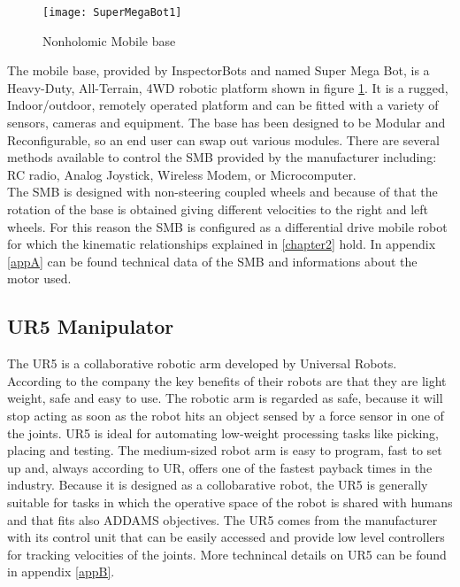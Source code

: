 \begin{figure}[h]
	\begin{center} 
		\texttt{[image: SuperMegaBot1]}
		\centering
		\caption{Nonholomic Mobile base}
		\label{fig:SuperMegaBot1}
	\end{center}
\end{figure}
The mobile base, provided by InspectorBots and named Super Mega Bot, is a Heavy-Duty, All-Terrain, 4WD robotic platform shown in figure \ref{fig:SuperMegaBot1}. It is a rugged, Indoor/outdoor, remotely operated platform and can be fitted with a variety of sensors, cameras and equipment. The base has been designed to be Modular and Reconfigurable, so an end user can swap out various modules. There are several methods available to control the SMB provided by the manufacturer including: RC radio, Analog Joystick, Wireless Modem, or Microcomputer.\\
The SMB is designed with non-steering coupled wheels and because of that the rotation of the base is obtained giving different velocities to the right and left wheels. For this reason the SMB is configured as a differential drive mobile robot for which the kinematic relationships explained in \ref{chapter2} hold.
In appendix \ref{appA} can be found technical data of the SMB and informations about the motor used.

\subsection{UR5 Manipulator}
The UR5 is a collaborative robotic arm developed by Universal Robots. According to the company the key benefits of their robots are that they are light weight, safe and easy to use. The robotic arm is regarded as safe, because it will stop acting as soon as the robot hits an object sensed by a force sensor in one of the joints. UR5 is ideal for automating low-weight processing tasks like picking, placing and testing. The medium-sized robot arm is easy to program, fast to set up and, always according to UR, offers one of the fastest payback times in the industry. Because it is designed as a collobarative robot, the UR5 is generally suitable for tasks in which the operative space of the robot is shared with humans and that fits also ADDAMS objectives. The UR5 comes from the manufacturer with its control unit that can be easily accessed and provide low level controllers for tracking velocities of the joints. More technincal details on UR5 can be found in appendix \ref{appB}.

